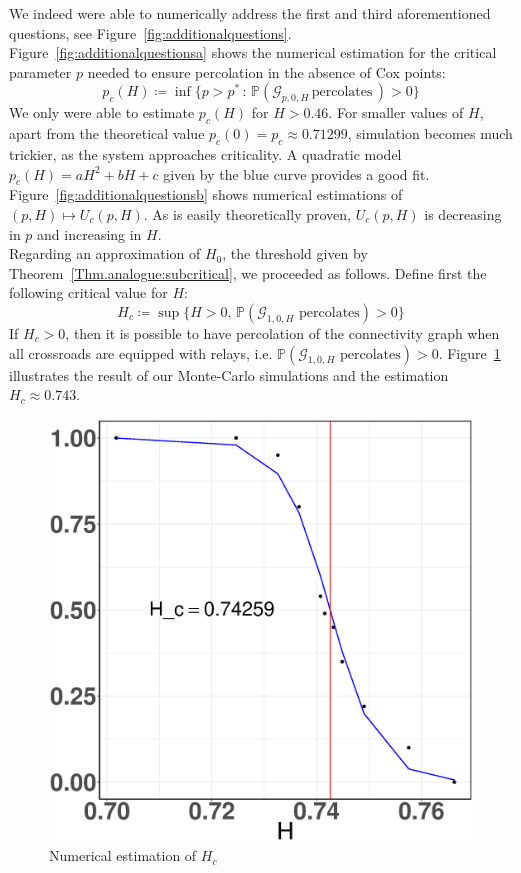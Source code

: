 \documentclass[10pt,a4paper]{amsart}
\theoremstyle{exampstyle}
\theoremstyle{exampnotations}
\begin{document}
We indeed were able to numerically address the first and third aforementioned questions, see Figure~\ref{fig:additionalquestions}. \\
Figure~\ref{fig:additionalquestionsa} shows the numerical estimation for the critical parameter $p$ needed to ensure percolation in the absence of Cox points:
\begin{equation*}
    p_c(H) \coloneqq \inf \lbrace p > p^* \, : \, \mathbb{P}(\mathcal{G}_{p,0,H} \, \text{percolates} \, ) > 0 \rbrace
\end{equation*}
We only were able to estimate $p_c(H)$ for $H>0.46$. For smaller values of $H$, apart from the theoretical value $p_c(0)=p_c \approx 0.71299$, simulation becomes much trickier, as the system approaches criticality. A quadratic model $p_c(H) = aH^2+bH+c$ given by the blue curve provides a good fit. Figure~\ref{fig:additionalquestionsb} shows numerical estimations of $(p,H) \mapsto U_c(p,H)$. As is easily theoretically proven, $U_c(p,H)$ is decreasing in $p$ and increasing in $H$. \\
Regarding an approximation of $H_0$, the threshold given by Theorem~\ref{Thm.analogue:subcritical}, we proceeded as follows. Define first the following critical value for $H$:
\begin{equation*}
    H_c \coloneqq \sup \lbrace H > 0, \, \mathbb{P}(\mathcal{G}_{1,0,H} \text{ percolates}) >0 \rbrace
\end{equation*}
If $H_c > 0$, then it is possible to have percolation of the connectivity graph when all crossroads are equipped with relays, i.e. $\mathbb{P}(\mathcal{G}_{1,0,H} \text{ percolates}) > 0$. Figure~\ref{fig:Hc} illustrates the result of our Monte-Carlo simulations and the estimation  $H_c \approx 0.743$.

\begin{figure}[h!]
    \centering
    \includegraphics[scale=0.21]{sites-H_c-p=1}
    \caption{Numerical estimation of $H_c$}
    \label{fig:Hc}
\end{figure}
\end{document}
